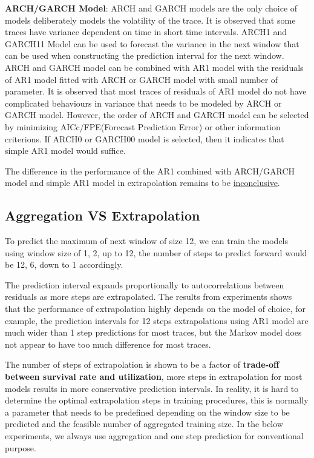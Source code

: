 \documentclass{article}
\begin{document}
\begin{flushleft}
\textbf{ARCH/GARCH Model}: ARCH and GARCH models are the only choice of models deliberately models the volatility of the trace. It is observed that some traces have variance dependent on time in short time intervals. ARCH1 and GARCH11 Model can be used to forecast the variance in the next window that can be used when constructing the prediction interval for the next window. ARCH and GARCH model can be combined with AR1 model with the residuals of AR1 model fitted with ARCH or GARCH model with small number of parameter. It is observed that most traces of residuals of AR1 model do not have complicated behaviours in variance that needs to be modeled by ARCH or GARCH model. However, the order of ARCH and GARCH model can be selected by minimizing AICc/FPE(Forecast Prediction Error) or other information criterions. If ARCH0 or GARCH00 model is selected, then it indicates that simple AR1 model would suffice. 

The difference in the performance of the AR1 combined with ARCH/GARCH model and simple AR1 model in extrapolation remains to be \underline{inconclusive}.
\end{flushleft}

\subsection{Aggregation VS Extrapolation}

\begin{flushleft}
To predict the maximum of next window of size 12, we can train the models using window size of 1, 2, up to 12, the number of steps to predict forward would be 12, 6, down to 1 accordingly.
\end{flushleft}

\begin{flushleft}
The prediction interval expands proportionally to autocorrelations between residuals as more steps are extrapolated. The results from experiments shows that the performance of extrapolation highly depends on the model of choice, for example, the prediction intervals for 12 steps extrapolations using AR1 model are much wider than 1 step predictions for most traces, but the Markov model does not appear to have too much difference for most traces.
\end{flushleft}

\begin{flushleft}
The number of steps of extrapolation is shown to be a factor of \textbf{trade-off between survival rate and utilization}, more steps in extrapolation for most models results in more conservative prediction intervals.
In reality, it is hard to determine the optimal extrapolation steps in training procedures, this is normally a parameter that needs to be predefined depending on the window size to be predicted and the feasible number of aggregated training size. In the below experiments, we always use aggregation and one step prediction for conventional purpose.
\end{flushleft}
\end{document}
